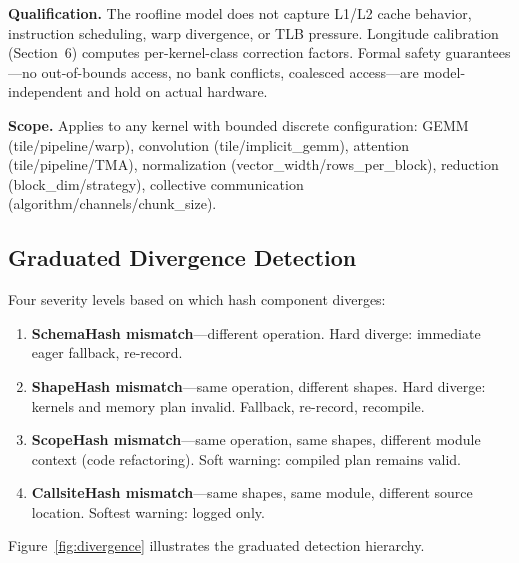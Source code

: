 \textbf{Qualification.}
The roofline model does not capture L1/L2 cache behavior, instruction scheduling, warp divergence, or TLB pressure.
Longitude calibration (Section~6) computes per-kernel-class correction factors.
Formal safety guarantees---no out-of-bounds access, no bank conflicts, coalesced access---are model-independent and hold on actual hardware.

\textbf{Scope.}
Applies to any kernel with bounded discrete configuration: GEMM (tile/pipeline/warp), convolution (tile/implicit\_gemm), attention (tile/pipeline/TMA), normalization (vector\_width/rows\_per\_block), reduction (block\_dim/strategy), collective communication (algorithm/channels/chunk\_size).

\subsection{Graduated Divergence Detection}

Four severity levels based on which hash component diverges:

\begin{enumerate}
  \item \textbf{SchemaHash mismatch}---different operation. Hard diverge: immediate eager fallback, re-record.
  \item \textbf{ShapeHash mismatch}---same operation, different shapes. Hard diverge: kernels and memory plan invalid. Fallback, re-record, recompile.
  \item \textbf{ScopeHash mismatch}---same operation, same shapes, different module context (code refactoring). Soft warning: compiled plan remains valid.
  \item \textbf{CallsiteHash mismatch}---same shapes, same module, different source location. Softest warning: logged only.
\end{enumerate}

Figure~\ref{fig:divergence} illustrates the graduated detection hierarchy.

